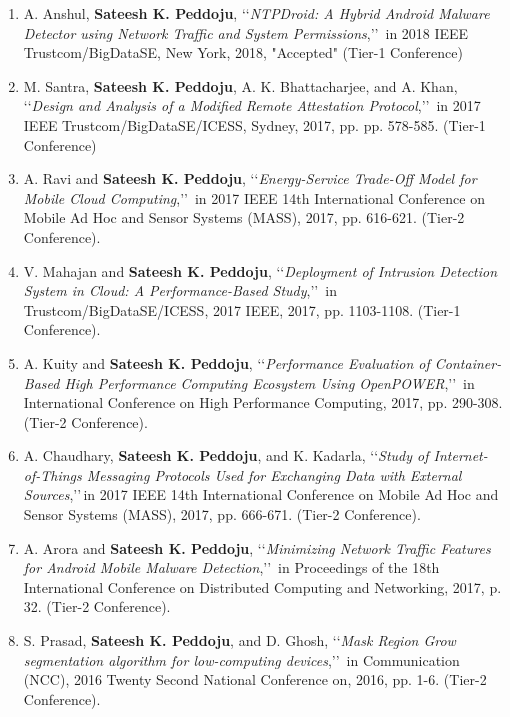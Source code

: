 \begin{enumerate}[label=(C\arabic*).]	

	\item
	A. Anshul, \textbf{Sateesh K. Peddoju}, \lq\lq \textit{NTPDroid: A Hybrid Android Malware Detector using Network Traffic and System Permissions},\rq\rq\, in 2018 IEEE Trustcom/BigDataSE, New York, 2018, "Accepted" (Tier-1 Conference)
	
	\item
	M. Santra, \textbf{Sateesh K. Peddoju}, A. K. Bhattacharjee, and A. Khan, \lq\lq \textit{Design and Analysis of a Modified Remote Attestation Protocol},\rq\rq\, in 2017 IEEE Trustcom/BigDataSE/ICESS, Sydney, 2017, pp. pp. 578-585. (Tier-1 Conference)
	
	\item
	A. Ravi and \textbf{Sateesh K. Peddoju}, \lq\lq \textit{Energy-Service Trade-Off Model for Mobile Cloud Computing},\rq\rq\, in 2017 IEEE 14th International Conference on Mobile Ad Hoc and Sensor Systems (MASS), 2017, pp. 616-621. (Tier-2 Conference).
	
	\item
	V. Mahajan and \textbf{Sateesh K. Peddoju}, \lq\lq \textit{Deployment of Intrusion Detection System in Cloud: A Performance-Based Study},\rq\rq\,  in Trustcom/BigDataSE/ICESS, 2017 IEEE, 2017, pp. 1103-1108. (Tier-1 Conference).
	
	\item
	A. Kuity and \textbf{Sateesh K. Peddoju}, \lq\lq \textit{Performance Evaluation of Container-Based High Performance Computing Ecosystem Using OpenPOWER},\rq\rq\,  in International Conference on High Performance Computing, 2017, pp. 290-308. (Tier-2 Conference).
	
	\item
	A. Chaudhary, \textbf{Sateesh K. Peddoju}, and K. Kadarla, \lq\lq \textit{Study of Internet-of-Things Messaging Protocols Used for Exchanging Data with External Sources},\rq\rq\,in 2017 IEEE 14th International Conference on Mobile Ad Hoc and Sensor Systems (MASS), 2017, pp. 666-671. (Tier-2 Conference).
	
	\item
	A. Arora and \textbf{Sateesh K. Peddoju}, \lq\lq \textit{Minimizing Network Traffic Features for Android Mobile Malware Detection},\rq\rq\, in Proceedings of the 18th International Conference on Distributed Computing and Networking, 2017, p. 32. (Tier-2 Conference).
	
	\item
	S. Prasad, \textbf{Sateesh K. Peddoju}, and D. Ghosh, \lq\lq \textit{Mask Region Grow segmentation algorithm for low-computing devices},\rq\rq\, in Communication (NCC), 2016 Twenty Second National Conference on, 2016, pp. 1-6. (Tier-2 Conference).
	

\end{enumerate}

